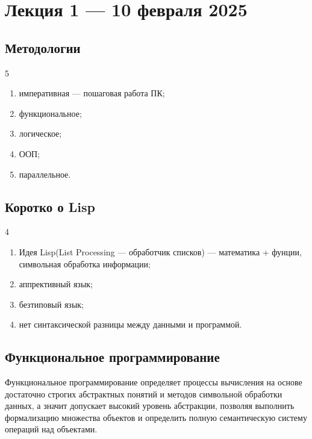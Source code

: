 \chapter{Лекция 1 — 10 февраля 2025}

\section{Методологии}

\begin{listbox}{\noindent \begin{listboxtitle}{}5\end{listboxtitle}}
    \begin{enumerate}
		\item императивная — пошаговая работа ПК;
		\item функциональное;
		\item логическое;
		\item ООП;
		\item параллельное.
	\end{enumerate}
\end{listbox}

\section{Коротко о Lisp}

\begin{listbox}{\noindent \begin{listboxtitle}{}4\end{listboxtitle}}
\begin{enumerate}
	\item Идея Lisp(List Processing — обработчик списков) — математика + фунции, символьная обработка информации;
	\item аппрективный язык;
	\item безтиповый язык;
	\item нет синтаксической разницы между данными и программой.
\end{enumerate}
\end{listbox}

\section{Функциональное программирование}
Функциональное программирование определяет процессы вычисления на основе достаточно строгих 
абстрактных понятий и методов символьной обработки данных, а значит допускает высокий уровень
абстракции, позволяя выполнить формализацию множества объектов и определить полную семантическую
систему операций над объектами. 


